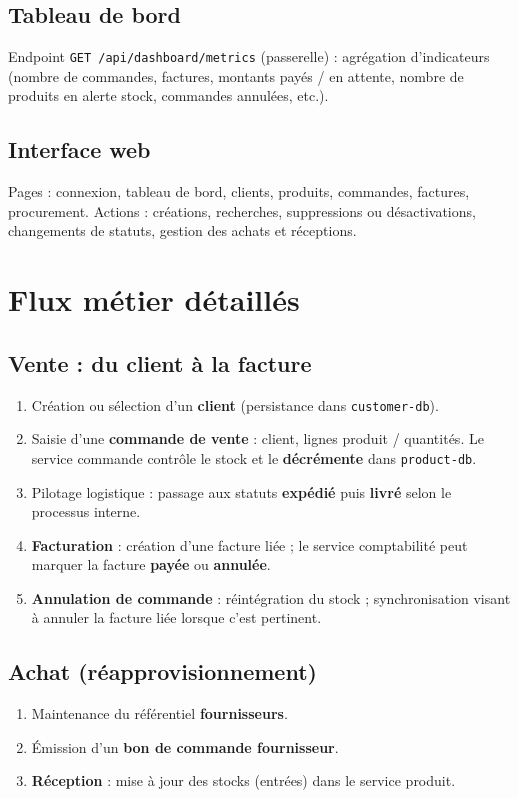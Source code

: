 \documentclass[11pt,a4paper]{article}
\begin{document}
\subsection{Tableau de bord}
Endpoint \texttt{GET /api/dashboard/metrics} (passerelle) : agrégation d'indicateurs (nombre de commandes, factures, montants payés / en attente, nombre de produits en alerte stock, commandes annulées, etc.).

\subsection{Interface web}
Pages : connexion, tableau de bord, clients, produits, commandes, factures, procurement. Actions : créations, recherches, suppressions ou désactivations, changements de statuts, gestion des achats et réceptions.

\section{Flux métier détaillés}
\label{sec:flux}

\subsection{Vente : du client à la facture}
\begin{enumerate}[noitemsep]
  \item Création ou sélection d'un \textbf{client} (persistance dans \texttt{customer-db}).
  \item Saisie d'une \textbf{commande de vente} : client, lignes produit / quantités. Le service commande contrôle le stock et le \textbf{décrémente} dans \texttt{product-db}.
  \item Pilotage logistique : passage aux statuts \textbf{expédié} puis \textbf{livré} selon le processus interne.
  \item \textbf{Facturation} : création d'une facture liée ; le service comptabilité peut marquer la facture \textbf{payée} ou \textbf{annulée}.
  \item \textbf{Annulation de commande} : réintégration du stock ; synchronisation visant à annuler la facture liée lorsque c'est pertinent.
\end{enumerate}

\subsection{Achat (réapprovisionnement)}
\begin{enumerate}[noitemsep]
  \item Maintenance du référentiel \textbf{fournisseurs}.
  \item Émission d'un \textbf{bon de commande fournisseur}.
  \item \textbf{Réception} : mise à jour des stocks (entrées) dans le service produit.
\end{enumerate}
\end{document}
